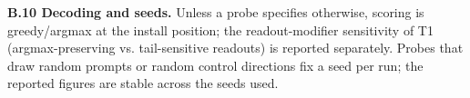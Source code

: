 \documentclass[11pt]{article}
\theoremstyle{plain}
\theoremstyle{definition}
\begin{document}
\textbf{B.10 Decoding and seeds.} Unless a probe specifies otherwise, scoring is greedy/argmax at the install position; the readout-modifier sensitivity of T1 (argmax-preserving vs. tail-sensitive readouts) is reported separately. Probes that draw random prompts or random control directions fix a seed per run; the reported figures are stable across the seeds used.
\end{document}
